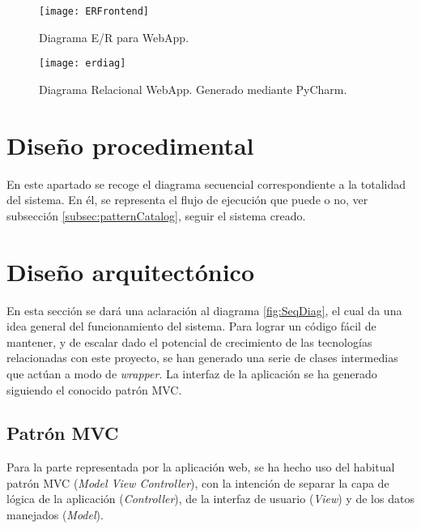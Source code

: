\begin{figure}[H]
	\centering
	\texttt{[image: ERFrontend]}
	\caption{Diagrama E/R para WebApp.}\label{fig:erFront}
\end{figure}

\begin{figure}[H]
	\centering
	\texttt{[image: erdiag]}
	\caption[Diagrama Relacional WebApp]{Diagrama Relacional WebApp. Generado mediante PyCharm.}\label{fig:erdiag}
\end{figure}

\section{Diseño procedimental}
En este apartado se recoge el diagrama secuencial correspondiente a la totalidad  del sistema. En él, se representa el flujo de ejecución que puede o no, ver subsección \ref{subsec:patternCatalog}, seguir el sistema creado. 




\section{Diseño arquitectónico}
En esta sección se dará una aclaración al diagrama \ref{fig:SeqDiag}, el cual da una idea general del funcionamiento del sistema. 
Para lograr un código fácil de mantener, y de escalar dado el potencial de crecimiento de las tecnologías relacionadas con este proyecto, se han generado una serie de clases intermedias que actúan a modo de \textit{wrapper}. La interfaz de la aplicación se ha generado siguiendo el conocido patrón MVC.

\subsection{Patrón MVC}
Para la parte representada por la aplicación web, se ha hecho uso del habitual patrón MVC (\textit{Model View Controller}), con la intención de separar la capa de lógica de la aplicación (\textit{Controller}), de la interfaz de usuario (\textit{View}) y de los datos manejados (\textit{Model}).

